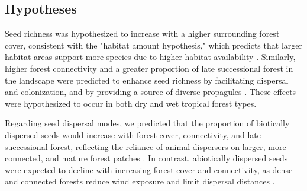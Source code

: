 

\subsection{Hypotheses}

Seed richness was hypothesized to increase with a higher surrounding forest cover, consistent with the "habitat amount hypothesis," which predicts that larger habitat areas support more species due to higher habitat availability \citep{arroyo-rodriguezLandscapescaleForestCover2023a, PEREZCARDENAS2021118818, arroyo-rodriguezMultipleSuccessionalPathways2017, fahrig2013rethinking}. Similarly, higher forest connectivity and a greater proportion of late successional forest in the landscape were predicted to enhance seed richness by facilitating dispersal and colonization, and by providing a source of diverse propagules \citep{huancanunezSeedrainsuccessionalFeedbacksWet2021, hordijkLandUseHistory2024, v.h.safarLandscapeOpennessHas2022a, martinez-ramosNaturalForestRegeneration2016, goosemForestAgeIsolation2016}. These effects were hypothesized to occur in both dry and wet tropical forest types.

Regarding seed dispersal modes, we predicted that the proportion of biotically dispersed seeds would increase with forest cover, connectivity, and late successional forest, reflecting the reliance of animal dispersers on larger, more connected, and mature forest patches \citep{chazdonDriversBenefitsNatural2025, martinez-ramosNaturalForestRegeneration2016, hordijkLandUseHistory2024, v.h.safarLandscapeOpennessHas2022a}. In contrast, abiotically dispersed seeds were expected to decline with increasing forest cover and connectivity, as dense and connected forests reduce wind exposure and limit dispersal distances \citep{poorterComprehensiveFrameworkVegetation2024, damschen2014fragmentation}.

